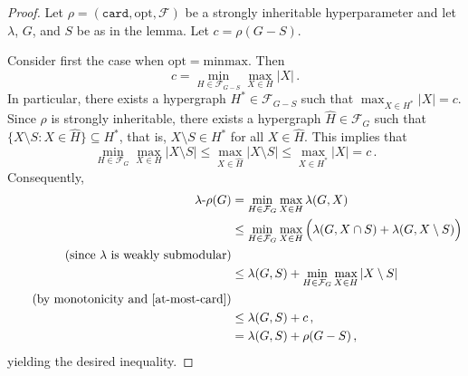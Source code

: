 \documentclass[11pt]{article}
\newcommand{\opt}{\mathrm{opt}}
\theoremstyle{plain}
\theoremstyle{definition}
\theoremstyle{remark}
\numberwithin{equation}{section}
\begin{document}
\begin{proof}
Let $\rho=(\mathtt{card},\opt,\mathcal{F})$ be a strongly inheritable  hyperparameter and let $\lambda$, $G$, and $S$ be as in the lemma.
Let $c = \rho(G-S)$.

Consider first the case when $\mathrm{opt}= \mathrm{minmax}$.
Then
\[c = \min_{H \in \mathcal{F}_{G-S}} \max_{X \in H} |X|\,.\]
In particular, there exists a hypergraph $H^* \in \mathcal{F}_{G-S}$ such that $\max_{X \in H^*} |X| = c$.
Since $\rho$ is strongly inheritable, there exists a hypergraph $\widehat H\in \mathcal{F}_{G}$ such that $\{X\setminus S\colon X\in \widehat H\} \subseteq H^*$, that is, $X\setminus S\in H^*$ for all $X\in \widehat H$.
This implies that 
\[\min_{H \in \mathcal{F}_{G}} \max_{X \in H} |X\setminus S| \le \max_{X \in \widehat{H}} |X\setminus S|\le \max_{X \in H^*} |X| = c\,.\]
Consequently, 
\begin{alignat*}{2}
\lambda\text{-}\rho(G) & = \min_{H \in \mathcal{F}_{G}} \max_{X \in H} \lambda(G,X) \\
&\le \min_{H \in \mathcal{F}_{G}} \max_{X \in H} \Big(\lambda(G,X \cap S) + \lambda(G,X\setminus S)\Big)\\ \tag*{\text{(since $\lambda$ is weakly submodular)}} \\
&\le \lambda(G,S) + \min_{H \in \mathcal{F}_{G}} \max_{X \in H} |X\setminus S|\\ \tag*{\text{(by monotonicity and \Cref{at-most-card})}} \\
&\le \lambda(G,S) +c\,,\\
&= \lambda(G,S) +\rho(G-S)\,,
\end{alignat*}
yielding the desired inequality.


\end{proof}
\end{document}
